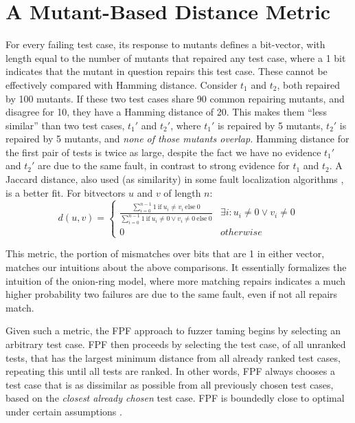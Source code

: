 \section{A Mutant-Based Distance Metric}

For every failing test case, its response to mutants defines a bit-vector, with
length equal to the number of mutants that repaired any test case,
where a 1 bit indicates that the mutant in question repairs this test
case.  These cannot be effectively compared with Hamming distance. Consider $t_1$ and $t_2$, both repaired
by 100 mutants.  If these two test cases share 90 common repairing
mutants, and disagree for 10, they have a Hamming
distance of 20.  This makes them ``less similar'' than two test cases,
$t_1'$ and $t_2'$, where $t_1'$ is repaired by 5 mutants, $t_2'$ is
repaired by 5 mutants, and \emph{none of those mutants overlap.}   Hamming distance for the first pair of tests is twice as
large, despite the fact we have no evidence $t_1'$ and
$t_2'$ are due to the same fault, in contrast to strong evidence for
$t_1$ and $t_2$.  A Jaccard distance, also used (as similarity) in some fault
localization algorithms \cite{Pinpoint}, is a better fit.  For bitvectors $u$ and $v$ of length $n$:
\[d(u,v) = 
\begin{cases}
\frac{\sum_{i=0}^{n-1} 1\ \text{if}\ u_i \neq v_i\ \text{else}\ 0}{\sum_{i=0}^{n-1} 1
\  \text{if}\ u_i \neq 0 \vee v_i \neq 0\ \text{else}\ 0} & \exists i:u_i\neq 0 \vee v_i\neq 0\\
0 & otherwise
\end{cases}
\]

This metric, the portion of mismatches over bits that are 1 in either
vector, matches our intuitions about the above comparisons.  It
essentially formalizes the intuition of the onion-ring model, where
more matching repairs indicates a much higher probability two failures
are due to the same fault, even if not all repairs match.

Given such a metric, the FPF \cite{Gonzalez} approach to fuzzer taming \cite{PLDI13}
begins by selecting an arbitrary test case.   FPF then proceeds by selecting the test
case, of all unranked tests, that has the largest minimum distance
from all already ranked test cases, repeating this until all tests are
ranked.  In other words, FPF always chooses a test case that is as dissimilar as
possible from all previously chosen test cases, based on the \emph{closest
already chosen} test case.  FPF is boundedly close
to optimal under certain assumptions \cite{Gonzalez}.

